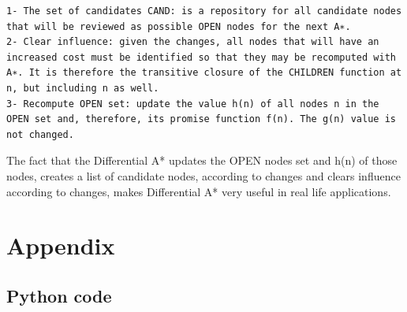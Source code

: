 \documentclass[12pt]{article}
\begin{document}
\begin{lstlisting}
1- The set of candidates CAND: is a repository for all candidate nodes that will be reviewed as possible OPEN nodes for the next A∗.
2- Clear influence: given the changes, all nodes that will have an increased cost must be identified so that they may be recomputed with A∗. It is therefore the transitive closure of the CHILDREN function at n, but including n as well.
3- Recompute OPEN set: update the value h(n) of all nodes n in the OPEN set and, therefore, its promise function f(n). The g(n) value is not changed.
\end{lstlisting}

The fact that the Differential A* updates the OPEN nodes set and h(n) of those nodes, creates a list of candidate nodes, according to changes and clears influence according to changes, makes Differential A* very useful in real life applications. 

\printbibliography

\section{Appendix}
\subsection{Python code}
\label{sec:pythonCode}

\end{document}
